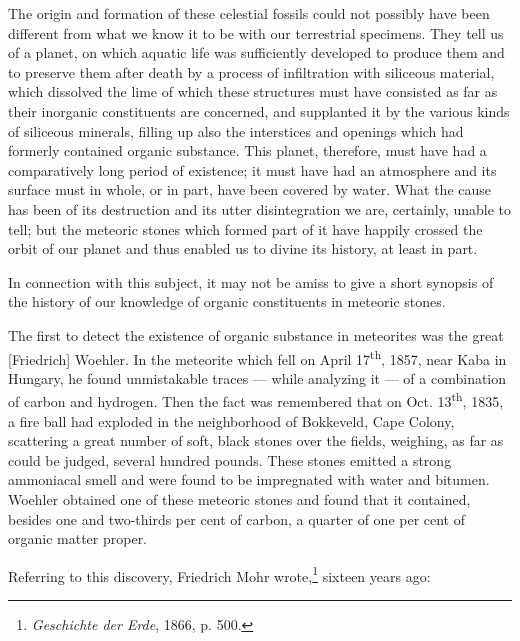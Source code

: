 \documentclass[a4paper, 12pt, oneside]{article}
\begin{document}
The origin and formation of these celestial fossils could not possibly have been different from what we know it to be with our terrestrial specimens. They tell us of a planet, on which aquatic life was sufficiently developed to produce them and to preserve them after death by a process of infiltration with siliceous material, which dissolved the lime of which these structures must have consisted as far as their inorganic constituents are concerned, and supplanted it by the various kinds of siliceous minerals, filling up also the interstices and openings which had formerly contained organic substance. This planet, therefore, must have had a comparatively long period of existence; it must have had an atmosphere and its surface must in whole, or in part, have been covered by water. What the cause has been of its destruction and its utter disintegration we are, certainly, unable to tell; but the meteoric stones which formed part of it have happily crossed the orbit of our planet and thus enabled us to divine its history, at least in part.

In connection with this subject, it may not be amiss to give a short synopsis of the history of our knowledge of organic constituents in meteoric stones.

The first to detect the existence of organic substance in meteorites was the great [Friedrich] Woehler. In the meteorite which fell on April 17\textsuperscript{th}, 1857, near Kaba in Hungary, he found unmistakable traces --- while analyzing it --- of a combination of carbon and hydrogen. Then the fact was remembered that on Oct. 13\textsuperscript{th}, 1835, a fire ball had exploded in the neighborhood of Bokkeveld, Cape Colony, scattering a great number of soft, black stones over the fields, weighing, as far as could be judged, several hundred pounds. These stones emitted a strong ammoniacal smell and were found to be impregnated with water and bitumen. Woehler obtained one of these meteoric stones and found that it contained, besides one and two-thirds per cent of carbon, a quarter of one per cent of organic matter proper.

Referring to this discovery, Friedrich Mohr wrote,\footnote{\emph{Geschichte der Erde}, 1866, p. 500.} sixteen years ago:
\end{document}
